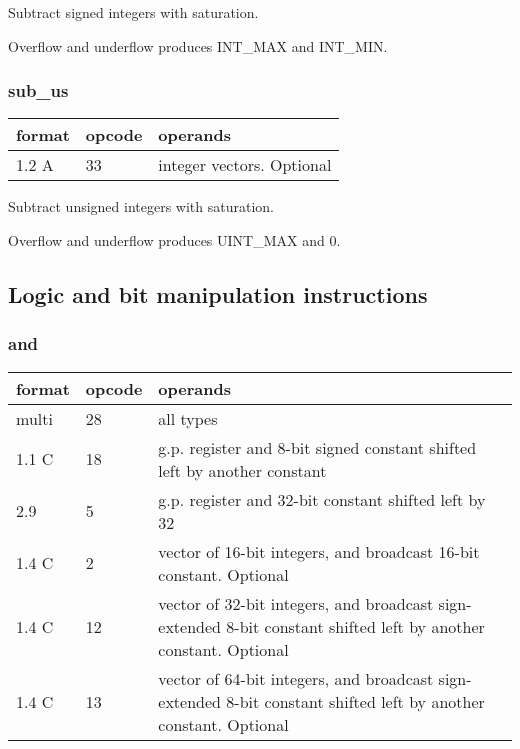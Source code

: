\documentclass[forwardcom.tex]{subfiles}
\begin{document}
Subtract signed integers with saturation.

Overflow and underflow produces INT\_MAX and INT\_MIN.

\subsubsection{sub\_us}
\label{table:subUsInstruction}
\begin{tabular}{|p{12mm}|p{12mm}|p{110mm}|}
\hline
\bfseries format & \bfseries opcode & \bfseries operands \\ \hline
1.2 A & 33 & integer vectors. Optional \\ \hline
\end{tabular}
\vspace{2mm}

Subtract unsigned integers with saturation.

Overflow and underflow produces UINT\_MAX and 0.


\subsection{Logic and bit manipulation instructions}

\subsubsection{and}
\label{table:andInstruction}
\begin{tabular}{|p{12mm}|p{12mm}|p{110mm}|}
\hline
\bfseries format & \bfseries opcode & \bfseries operands \\ \hline
multi & 28 & all types \\ \hline
1.1 C & 18 & g.p. register and 8-bit signed constant shifted left by another constant \\ \hline
2.9   &  5 & g.p. register and 32-bit constant shifted left by 32 \\ \hline
1.4 C &  2 & vector of 16-bit integers, and broadcast 16-bit constant. Optional \\ \hline
1.4 C & 12 & vector of 32-bit integers, and broadcast sign-extended 8-bit constant shifted left by another constant. Optional \\ \hline
1.4 C & 13 & vector of 64-bit integers, and broadcast sign-extended 8-bit constant shifted left by another constant. Optional \\ \hline
\end{tabular}
\vspace{2mm}
\end{document}
